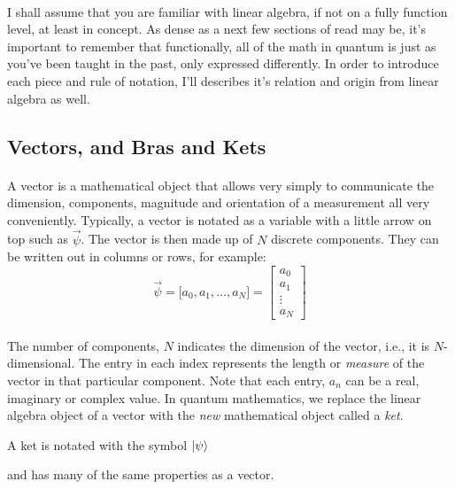 \documentclass[12pt,letterpaper]{book}
\begin{document}
\paragraph*{}I shall assume that you are familiar with linear algebra, if not on a fully function level, at least in concept. As dense as a next few sections of read may be, it's important to remember that functionally, all of the math in quantum is just as you've been taught in the past, only expressed differently. In order to introduce each piece and rule of notation, I'll describes it's relation and origin from linear algebra as well.


\subsection*{Vectors, and Bras and Kets}
\paragraph*{}A vector is a mathematical object that allows very simply to communicate the dimension, components, magnitude and orientation of a measurement all very conveniently. Typically, a vector is notated as a variable with a little arrow on top such as $\vec{\psi}$. The vector is then made up of $N$ discrete components. They can be written out in columns or rows, for example:
\begin{equation}
\label{vector}
\vec{\psi} = \big[ a_0 , a_1 , \hdots , a_N ] =
\begin{bmatrix}
a_0 \\ a_1  \\ \vdots \\ a_N
\end{bmatrix}
\end{equation}
\paragraph*{}The number of components, $N$ indicates the dimension of the vector, i.e., it is $N$-dimensional. The entry in each index represents the length or \textit{measure} of the vector in that particular component. Note that each entry, $a_n$ can be a real, imaginary or complex value. In quantum mathematics, we replace the linear algebra object of a vector with the \textit{new} mathematical object called a \textit{ket}.
\begin{center}
A ket is notated with the symbol $\ket{\psi}$ 
\end{center} 
and has many of the same properties as a vector.
\end{document}
